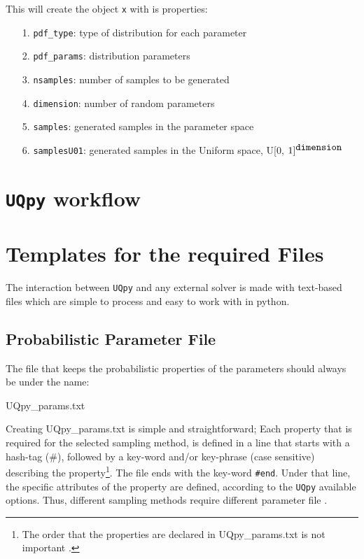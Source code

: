 \vspace{4mm}
\noindent
This will create the object \texttt{x} with is properties:

\begin{itemize}
	\item[1.] \texttt{pdf\_type}: type of distribution for each parameter
	\item[2.] \texttt{pdf\_params}: distribution parameters
	\item[3.] \texttt{nsamples}: number of samples to be generated
	\item[4.] \texttt{dimension}: number of random parameters
	\item[5.] \texttt{samples}: generated samples in the parameter space
	\item[6.] \texttt{samplesU01}: generated samples in the Uniform space, U[0, $1]^{\mbox{\texttt{dimension}}}$
	\end{itemize}



\section{\texttt{UQpy} workflow}


\section{Templates for the required  Files}

\noindent
The interaction between \texttt{UQpy}  and any external solver is made  with text-based files which are simple to process and easy to work with in python.  

\subsection{Probabilistic Parameter File}

\noindent
The file that keeps the probabilistic properties of the parameters should always be under the name:

\vspace{4mm}
{\centering
{\color{magenta}UQpy\_params.txt}\par}

\vspace{4mm}
\noindent
Creating {\color{magenta}UQpy\_params.txt} is simple and straightforward; Each property that is required for the selected sampling method, is defined in a line  that starts  with a hash-tag (\#),  followed by a key-word and/or key-phrase (case sensitive) describing the property\footnote{The order that the properties are declared in {\color{magenta}UQpy\_params.txt} is not important .}. The file ends with the key-word \texttt{\#end}. Under that line, the specific attributes of the property are defined, according to the \texttt{UQpy} available options. Thus, different sampling methods require different parameter file . 


